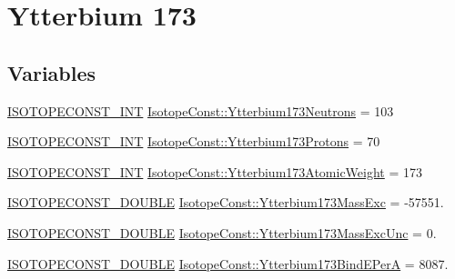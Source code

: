 \hypertarget{group___isotope_const-_ytterbium-_yb173}{}\section{Ytterbium 173}
\label{group___isotope_const-_ytterbium-_yb173}
\subsection*{Variables}
\begin{DoxyCompactItemize}
\item 
\mbox{\hyperlink{group___isotope_const-_macros_ga5f18360b3e99483a35c32d789e62621c}{I\+S\+O\+T\+O\+P\+E\+C\+O\+N\+S\+T\+\_\+\+I\+NT}} \mbox{\hyperlink{group___isotope_const-_ytterbium-_yb173_ga0d6e33e7ae5dc9164442169d8de2f5b5}{Isotope\+Const\+::\+Ytterbium173\+Neutrons}} = 103
\item 
\mbox{\hyperlink{group___isotope_const-_macros_ga5f18360b3e99483a35c32d789e62621c}{I\+S\+O\+T\+O\+P\+E\+C\+O\+N\+S\+T\+\_\+\+I\+NT}} \mbox{\hyperlink{group___isotope_const-_ytterbium-_yb173_gaae2eb5562cf414109319682e6d9e1f5d}{Isotope\+Const\+::\+Ytterbium173\+Protons}} = 70
\item 
\mbox{\hyperlink{group___isotope_const-_macros_ga5f18360b3e99483a35c32d789e62621c}{I\+S\+O\+T\+O\+P\+E\+C\+O\+N\+S\+T\+\_\+\+I\+NT}} \mbox{\hyperlink{group___isotope_const-_ytterbium-_yb173_ga56c6c3d031fa89ebd99568e9afbe7280}{Isotope\+Const\+::\+Ytterbium173\+Atomic\+Weight}} = 173
\item 
\mbox{\hyperlink{group___isotope_const-_macros_ga8f45a7272ce02c0b4c65c44636ed719a}{I\+S\+O\+T\+O\+P\+E\+C\+O\+N\+S\+T\+\_\+\+D\+O\+U\+B\+LE}} \mbox{\hyperlink{group___isotope_const-_ytterbium-_yb173_ga2dc6da3a2bd28abe1b2569cff5b526df}{Isotope\+Const\+::\+Ytterbium173\+Mass\+Exc}} = -\/57551.
\item 
\mbox{\hyperlink{group___isotope_const-_macros_ga8f45a7272ce02c0b4c65c44636ed719a}{I\+S\+O\+T\+O\+P\+E\+C\+O\+N\+S\+T\+\_\+\+D\+O\+U\+B\+LE}} \mbox{\hyperlink{group___isotope_const-_ytterbium-_yb173_ga043034d5d489ee07e751a7053e17624c}{Isotope\+Const\+::\+Ytterbium173\+Mass\+Exc\+Unc}} = 0.
\item 
\mbox{\hyperlink{group___isotope_const-_macros_ga8f45a7272ce02c0b4c65c44636ed719a}{I\+S\+O\+T\+O\+P\+E\+C\+O\+N\+S\+T\+\_\+\+D\+O\+U\+B\+LE}} \mbox{\hyperlink{group___isotope_const-_ytterbium-_yb173_ga53801796e032cfe5e08c210921eb2b8c}{Isotope\+Const\+::\+Ytterbium173\+Bind\+E\+PerA}} = 8087.
\item 

\end{DoxyCompactItemize}
